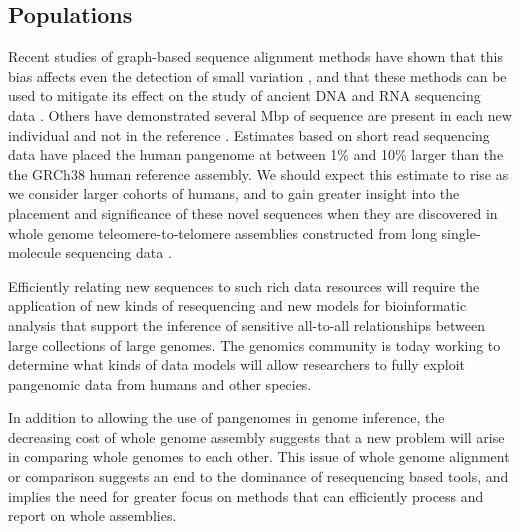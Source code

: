 \subsection{Populations}

Recent studies of graph-based sequence alignment methods have shown that this bias affects even the detection of small variation \cite{eggertsson2017graphtyper,Garrison_2018}, and that these methods can be used to mitigate its effect on the study of ancient DNA \cite{martiniano2019removing} and RNA sequencing data \cite{Kim_2019}.
Others have demonstrated several Mbp of sequence are present in each new individual and not in the reference \cite{li2010building,Steinberg_2016,Audano_2019}.
Estimates based on short read sequencing data have placed the human pangenome at between 1\% \cite{li2010building} and 10\% \cite{sherman2019assembly} larger than the the GRCh38 human reference assembly.
We should expect this estimate to rise as we consider larger cohorts of humans, and to gain greater insight into the placement and significance of these novel sequences when they are discovered in whole genome teleomere-to-telomere assemblies constructed from long single-molecule sequencing data \cite{miga2019telomere,Langley_2019}.

Efficiently relating new sequences to such rich data resources will require the application of new kinds of resequencing and new models for bioinformatic analysis that support the inference of sensitive all-to-all relationships between large collections of large genomes.
The genomics community is today working to determine what kinds of data models will allow researchers to fully exploit pangenomic data from humans and other species.

In addition to allowing the use of pangenomes in genome inference, the decreasing cost of whole genome assembly suggests that a new problem will arise in comparing whole genomes to each other.
This issue of whole genome alignment or comparison suggests an end to the dominance of resequencing based tools, and implies the need for greater focus on methods that can efficiently process and report on whole assemblies.

